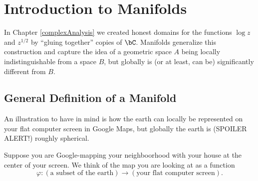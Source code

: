 \chapter{Introduction to Manifolds}
\label{manifolds}

In Chapter \ref{complexAnalysis} we created honest domains for the functions $\log z$ and $z^{1/2}$ by ``gluing together'' copies of $\bC$. Manifolds generalize this construction and capture the idea of a geometric space $A$ being locally indistinguishable from a space $B$, but globally is (or at least, can be) significantly different from $B$.




\section{General Definition of a Manifold}

An illustration to have in mind is how the earth can locally be represented on your flat computer screen in
Google Maps, but globally the earth is (SPOILER ALERT!) roughly spherical.




Suppose you are Google-mapping your neighboorhood with your house at the center of your screen.
We think of the map you are looking at as a function
$$
  \varphi:(\text{a subset of the earth}) \to (\text{your flat computer screen}).
$$


